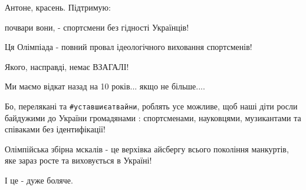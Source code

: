 \begin{itemize}
 
Антоне, красень. Підтримую:

 
почвари вони, - спортсмени без гідності Українців!

Ця Олімпіада - повний провал ідеологічного виховання спортсменів!

Якого, насправді, немає ВЗАГАЛІ!

Ми маємо відкат назад на 10 років... якщо не більше....

Бо, перелякані та \verb|#уставшиєатвайни|, роблять усе можливе, щоб наші діти
росли байдужими до України громадянами : спортсменами, науковцями, музикантами
та співаками без ідентифікації!

Олімпійська збірна мскалів - це верхівка айсбергу всього покоління манкуртів,
яке зараз росте та виховується в Україні!

І це - дуже боляче.


\end{itemize}

